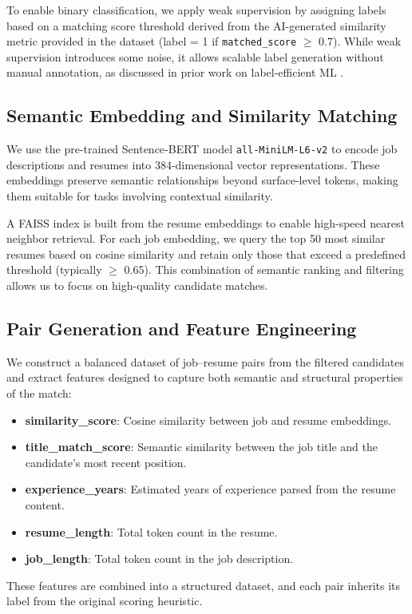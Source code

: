 \documentclass[a4paper]{article}
\begin{document}
\begin{multicols}{2}
To enable binary classification, we apply weak supervision by assigning labels based on a matching score threshold derived from the AI-generated similarity metric provided in the dataset (label = 1 if \texttt{matched\_score} $\geq$ 0.7). While weak supervision introduces some noise, it allows scalable label generation without manual annotation, as discussed in prior work on label-efficient ML \cite{10}.

\subsection{Semantic Embedding and Similarity Matching}
We use the pre-trained Sentence-BERT model \texttt{all-MiniLM-L6-v2} \cite{3} to encode job descriptions and resumes into 384-dimensional vector representations. These embeddings preserve semantic relationships beyond surface-level tokens, making them suitable for tasks involving contextual similarity.

A FAISS index \cite{6} is built from the resume embeddings to enable high-speed nearest neighbor retrieval. For each job embedding, we query the top 50 most similar resumes based on cosine similarity and retain only those that exceed a predefined threshold (typically $\geq$ 0.65). This combination of semantic ranking and filtering allows us to focus on high-quality candidate matches.

\subsection{Pair Generation and Feature Engineering}
We construct a balanced dataset of job--resume pairs from the filtered candidates and extract features designed to capture both semantic and structural properties of the match:
\begin{itemize}
    \item \textbf{similarity\_score}: Cosine similarity between job and resume embeddings.
    \item \textbf{title\_match\_score}: Semantic similarity between the job title and the candidate’s most recent position.
    \item \textbf{experience\_years}: Estimated years of experience parsed from the resume content.
    \item \textbf{resume\_length}: Total token count in the resume.
    \item \textbf{job\_length}: Total token count in the job description.
\end{itemize}
These features are combined into a structured dataset, and each pair inherits its label from the original scoring heuristic.


\end{multicols}
\end{document}
